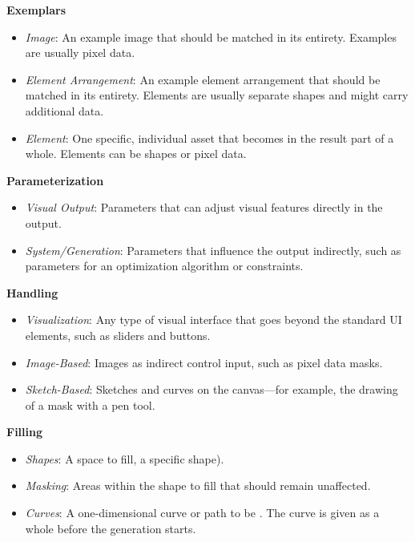 \noindent\textbf{Exemplars}
\begin{itemize}
    \item \textit{Image}: An example image that should be matched in its entirety. Examples are usually pixel data.
    \item \textit{Element Arrangement}: An example element arrangement that should be matched in its entirety. Elements are usually separate shapes and might carry additional data.
    \item \textit{Element}: One specific, individual asset that becomes in the result part of a whole. Elements can be shapes or pixel data.
\end{itemize}

\noindent\textbf{Parameterization}
\begin{itemize}
    \item \textit{Visual Output}: Parameters that can adjust visual features directly in the output.
    \item \textit{System/Generation}: Parameters that influence the output indirectly, such as parameters for an optimization algorithm or constraints.
\end{itemize}

\noindent\textbf{Handling}
\begin{itemize}
    \item \textit{Visualization}: Any type of visual interface that goes beyond the standard UI elements, such as sliders and buttons.
    \item \textit{Image-Based}: Images as indirect control input, such as pixel data masks.
    \item \textit{Sketch-Based}: Sketches and curves  on the canvas---for example, the drawing of a mask with a pen tool.
\end{itemize}

\noindent\textbf{Filling}
\begin{itemize}
    \item \textit{Shapes}: A space to fill, \eg a specific shape).
    \item \textit{Masking}: Areas within the shape to fill that should remain unaffected.
    \item \textit{Curves}: A one-dimensional curve or path to be . The curve is given as a whole before the generation starts.
\end{itemize}


